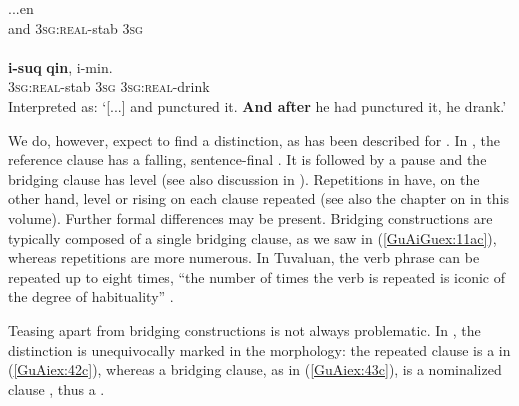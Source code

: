 \documentclass[output=paper]{LSP/langsci}
\begin{document}
\begin{exe}
\ex \label{GuAiex:41ab}
\begin{xlist}
\ex \label{GuAiex:41a}
\gll ...en   \underline{}       \underline{} \\
and   \textsc{3sg:real}-stab   \textsc{3sg}    \\
\glt {} \\

\ex \label{GuAiex:41b}
\gll \textbf{i-suq}       \textbf{qin}, i-min.  \\
\textsc{3sg:real}-stab   \textsc{3sg}   \textsc{3sg:real}-drink\\
\glt {} Interpreted as: `[...] and punctured it. \textbf{And after} he had punctured it, he drank.' \citep[][260]{dimock09}
\end{xlist}
\end{exe}

We do, however, expect to find a  distinction, as has been described for  \citep[][389--391]{schulze73}. In , the reference clause has a falling, sentence-final . It is followed by a pause and the bridging clause has level  (see also discussion in ). Repetitions in  have, on the other hand, level or rising  on each clause repeated (see also the chapter on  in this volume). Further formal differences may be present. Bridging constructions are typically composed of a single bridging clause, as we saw in (\ref{GuAiGuex:11ac}), whereas repetitions are more numerous. In Tuvaluan, the verb phrase can be repeated up to eight times, ``the number of times the verb is repeated is iconic of the degree of habituality'' \citep[][487]{besnier00}.

Teasing apart  from bridging constructions is not always problematic. In , the distinction is unequivocally marked in the morphology: the repeated clause is a  in (\ref{GuAiex:42c}), whereas a bridging clause, as in (\ref{GuAiex:43c}), is a nominalized  clause \citep[][518]{kasia17}, thus a . 
\pagebreak
\end{document}
